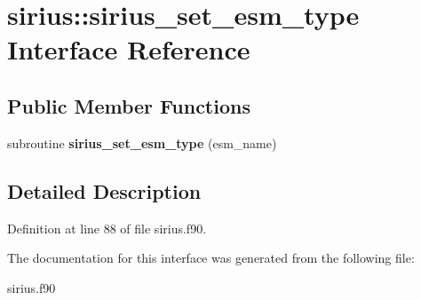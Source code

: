 \hypertarget{interfacesirius_1_1sirius__set__esm__type}{}\section{sirius\+:\+:sirius\+\_\+set\+\_\+esm\+\_\+type Interface Reference}
\label{interfacesirius_1_1sirius__set__esm__type}
\subsection*{Public Member Functions}
\begin{DoxyCompactItemize}
\item 
\hypertarget{interfacesirius_1_1sirius__set__esm__type_ae0e0bc146cc870586b7213d617d4273a}{}subroutine {\bfseries sirius\+\_\+set\+\_\+esm\+\_\+type} (esm\+\_\+name)\label{interfacesirius_1_1sirius__set__esm__type_ae0e0bc146cc870586b7213d617d4273a}

\end{DoxyCompactItemize}


\subsection{Detailed Description}


Definition at line 88 of file sirius.\+f90.



The documentation for this interface was generated from the following file\+:\begin{DoxyCompactItemize}
\item 
sirius.\+f90\end{DoxyCompactItemize}
